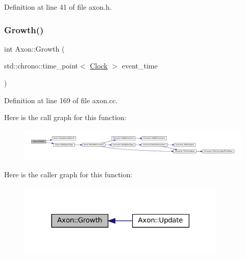Definition at line 41 of file axon.\+h.

\mbox{\label{class_axon_a0065c335bc57e0a75962bcbd91f35001}} 
\subsubsection{\texorpdfstring{Growth()}{Growth()}}
{\footnotesize\ttfamily int Axon\+::\+Growth (\begin{DoxyParamCaption}\item[{std\+::chrono\+::time\+\_\+point$<$ \mbox{\hyperlink{universe_8h_a0ef8d951d1ca5ab3cfaf7ab4c7a6fd80}{Clock}} $>$}]{event\+\_\+time }\end{DoxyParamCaption})}



Definition at line 169 of file axon.\+cc.

Here is the call graph for this function\+:\nopagebreak
\begin{figure}[H]
\begin{center}
\leavevmode
\includegraphics[width=350pt]{class_axon_a0065c335bc57e0a75962bcbd91f35001_cgraph}
\end{center}
\end{figure}
Here is the caller graph for this function\+:\nopagebreak
\begin{figure}[H]
\begin{center}
\leavevmode
\includegraphics[width=282pt]{class_axon_a0065c335bc57e0a75962bcbd91f35001_icgraph}
\end{center}
\end{figure}
\mbox{\label{class_axon_a7b43ca7f5b696c72ac17a27fea3b2822}} 
